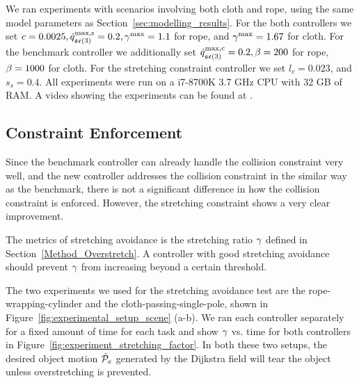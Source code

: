 We ran experiments with scenarios involving both cloth and rope, using the same model parameters as Section~\ref{sec:modelling_results}. For the both controllers we set $c = 0.0025, \dot{q}^\textrm{max,s}_{\mathfrak{se}(3)} = 0.2, \gamma^{\textrm{max}} = 1.1$ for rope, and $\gamma^{\textrm{max}} = 1.67$ for cloth. For the benchmark controller we additionally set $\dot{q}^\textrm{max,c}_{\mathfrak{se}(3)} = 0.2, \beta = 200$ for rope, $\beta = 1000$ for cloth. For the stretching constraint controller we set $l_c = 0.023$, and $s_s = 0.4$. All experiments were run on a i7-8700K 3.7 GHz CPU with 32 GB of RAM. A video showing the experiments can be found at \irosurl.


\subsection{Constraint Enforcement}
\label{Results: Object Stretching Avoidance}

Since the benchmark controller can already handle the collision constraint very well, and the new controller addresses the collision constraint in the similar way as the benchmark, there is not a significant difference in how the collision constraint is enforced. However, the stretching constraint shows a very clear improvement.

The metrics of stretching avoidance is the stretching ratio $\gamma$ defined in Section~\ref{Method_Overstretch}. A controller with good stretching avoidance should prevent $\gamma$ from increasing beyond a certain threshold.

The two experiments we used for the stretching avoidance test are the rope-wrapping-cylinder and the cloth-passing-single-pole, shown in Figure~\ref{fig:experimental_setup_scene} (a-b). We ran each controller separately for a fixed amount of time for each task and show $\gamma$ vs. time for both controllers in Figure~\ref{fig:experiment_stretching_factor}. In both these two setups, the desired object motion $\dot{\mathcal{P}}_e$ generated by the Dijkstra field will tear the object unless overstretching is prevented.


